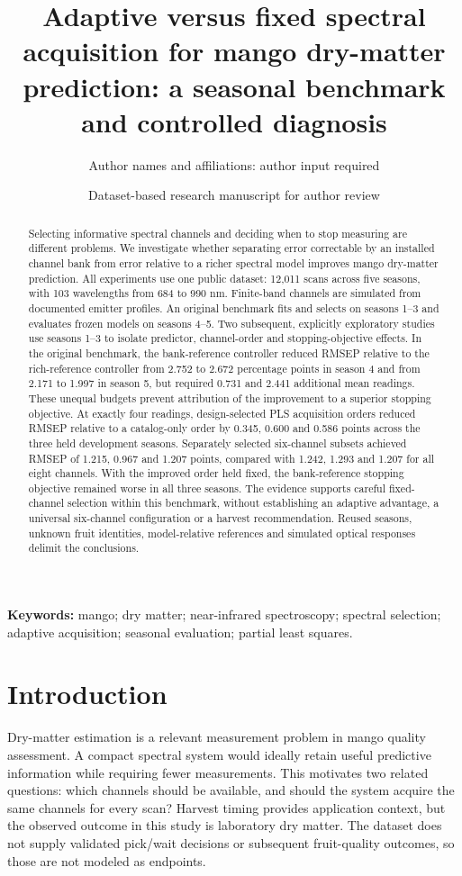 \documentclass[11pt,a4paper]{article}
\title{Adaptive versus fixed spectral acquisition for mango dry-matter prediction: a seasonal benchmark and controlled diagnosis}
\author{Author names and affiliations: author input required}
\date{Dataset-based research manuscript for author review}
\begin{document}
\maketitle
\begin{abstract}
Selecting informative spectral channels and deciding when to stop measuring are different problems. We investigate whether separating error correctable by an installed channel bank from error relative to a richer spectral model improves mango dry-matter prediction. All experiments use one public dataset: 12,011 scans across five seasons, with 103 wavelengths from 684 to 990 nm. Finite-band channels are simulated from documented emitter profiles. An original benchmark fits and selects on seasons 1--3 and evaluates frozen models on seasons 4--5. Two subsequent, explicitly exploratory studies use seasons 1--3 to isolate predictor, channel-order and stopping-objective effects. In the original benchmark, the bank-reference controller reduced RMSEP relative to the rich-reference controller from 2.752 to 2.672 percentage points in season 4 and from 2.171 to 1.997 in season 5, but required 0.731 and 2.441 additional mean readings. These unequal budgets prevent attribution of the improvement to a superior stopping objective. At exactly four readings, design-selected PLS acquisition orders reduced RMSEP relative to a catalog-only order by 0.345, 0.600 and 0.586 points across the three held development seasons. Separately selected six-channel subsets achieved RMSEP of 1.215, 0.967 and 1.207 points, compared with 1.242, 1.293 and 1.207 for all eight channels. With the improved order held fixed, the bank-reference stopping objective remained worse in all three seasons. The evidence supports careful fixed-channel selection within this benchmark, without establishing an adaptive advantage, a universal six-channel configuration or a harvest recommendation. Reused seasons, unknown fruit identities, model-relative references and simulated optical responses delimit the conclusions.
\end{abstract}

\textbf{Keywords:} mango; dry matter; near-infrared spectroscopy; spectral selection; adaptive acquisition; seasonal evaluation; partial least squares.

\section{Introduction}
Dry-matter estimation is a relevant measurement problem in mango quality assessment. A compact spectral system would ideally retain useful predictive information while requiring fewer measurements. This motivates two related questions: which channels should be available, and should the system acquire the same channels for every scan? Harvest timing provides application context, but the observed outcome in this study is laboratory dry matter. The dataset does not supply validated pick/wait decisions or subsequent fruit-quality outcomes, so those are not modeled as endpoints.
\end{document}
